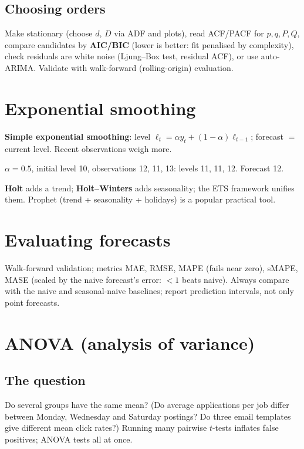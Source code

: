 \subsection{Choosing orders}
Make stationary (choose $d$, $D$ via ADF and plots), read ACF/PACF for $p, q, P, Q$, compare candidates by \textbf{AIC/BIC} (lower is better: fit penalised by complexity),
check residuals are white noise (Ljung--Box test, residual ACF), or use auto-ARIMA. Validate with walk-forward (rolling-origin) evaluation.

\section{Exponential smoothing}
\textbf{Simple exponential smoothing}: level $\ell_t = \alpha y_t + (1-\alpha)\ell_{t-1}$; forecast $=$ current level. Recent observations weigh more.
\begin{example}[: SES]
$\alpha = 0.5$, initial level 10, observations 12, 11, 13: levels 11, 11, 12. Forecast 12.
\end{example}
\textbf{Holt} adds a trend; \textbf{Holt--Winters} adds seasonality; the ETS framework unifies them. Prophet (trend + seasonality + holidays) is a popular practical tool.

\section{Evaluating forecasts}
Walk-forward validation; metrics MAE, RMSE, MAPE (fails near zero), sMAPE, MASE (scaled by the naive forecast's error: $<1$ beats naive). Always compare with the naive and
seasonal-naive baselines; report prediction intervals, not only point forecasts.

\section{ANOVA (analysis of variance)}
\subsection{The question}
Do several groups have the same mean? (Do average applications per job differ between Monday, Wednesday and Saturday postings? Do three email templates give
different mean click rates?) Running many pairwise $t$-tests inflates false positives; ANOVA tests all at once.


